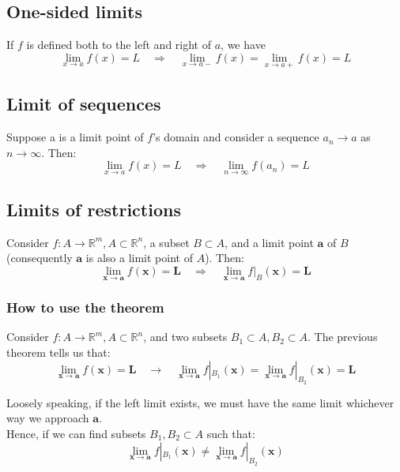 \documentclass[11pt]{article}
\begin{document}
\subsection{One-sided limits}
\label{sec:orge689877}
If \(f\) is defined both to the left and right of \(a\), we have
\[\lim_{x \rightarrow a} f(x) = L \quad \Rightarrow \quad \lim_{x \rightarrow a-} f(x) = \lim_{x \rightarrow a+} f(x) = L\]

\subsection{Limit of sequences}
\label{sec:org043cfc4}
Suppose a is a limit point of \(f\)'s domain and consider a sequence \(a_n \rightarrow a\) as \(n \rightarrow \infty\). Then:
\[\lim_{x \rightarrow a} f(x) = L \quad \Rightarrow \quad \lim_{n \rightarrow \infty} f(a_n) = L\]

\newpage

\subsection{Limits of restrictions}
\label{sec:org2a864a9}
Consider \(f : A \rightarrow \mathbb{R}^m, A \subset \mathbb{R}^n\), a subset \(B \subset A\), and a limit point \(\boldsymbol{a}\) of \(B\) (consequently \(\boldsymbol{a}\) is also a limit point of \(A\)). Then:
\[\lim_{\boldsymbol{x} \rightarrow \boldsymbol{a}} f(\boldsymbol{x}) = \boldsymbol{L} \quad \Rightarrow \quad \lim_{\boldsymbol{x} \rightarrow \boldsymbol{a}} f|_B(\boldsymbol{x}) = \boldsymbol{L}\]

\subsubsection{How to use the theorem}
\label{sec:org8ec494a}
Consider \(f : A \rightarrow \mathbb{R}^m, A \subset \mathbb{R}^n\), and two subsets \(B_1 \subset A, B_2 \subset A\). The previous theorem tells us that:
\[\lim_{\boldsymbol{x} \rightarrow \boldsymbol{a}} f(\boldsymbol{x}) = \boldsymbol{L} \quad \rightarrow \quad \lim_{\boldsymbol{x} \rightarrow \boldsymbol{a}} f|_{B_1} (\boldsymbol{x}) = \lim_{\boldsymbol{x} \rightarrow \boldsymbol{a}} f|_{B_2}(\boldsymbol{x}) = \boldsymbol{L}\]

Loosely speaking, if the left limit exists, we must have the same limit whichever way we approach \(\boldsymbol{a}\).
\\[0pt]

Hence, if we can find subsets \(B_1, B_2 \subset A\) such that:
\[\lim_{\boldsymbol{x} \rightarrow \boldsymbol{a}} f|_{B_1}(\boldsymbol{x}) \ne \lim_{\boldsymbol{x} \rightarrow \boldsymbol{a}} f|_{B_2} (\boldsymbol{x})\]
\end{document}
